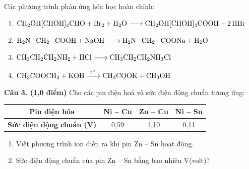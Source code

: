 \documentclass[11pt,a4paper]{article}
\begin{document}
\begin{tcolorbox}[colback=tableGreen!30,colframe=mainGreen!70,title=\textbf{Hướng dẫn giải chi tiết Câu 2},fonttitle=\bfseries]
Các phương trình phản ứng hóa học hoàn chỉnh:
\begin{enumerate}[label=\alph*),leftmargin=15pt,itemsep=3pt]
\item $\ce{CH2OH[CHOH]4CHO + Br2 + H2O -> CH2OH[CHOH]4COOH + 2HBr}$
\item $\ce{H2N-CH2-COOH + NaOH -> H2N-CH2-COONa + H2O}$
\item $\ce{CH3CH2CH2NH2 + HCl -> CH3CH2CH2NH3Cl}$
\item $\ce{CH3COOCH3 + KOH ->[t^\circ] CH3COOK + CH3OH}$
\end{enumerate}
\end{tcolorbox}

\vspace{2pt}
\noindent
\textbf{Câu 3. (1,0 điểm)} Cho các pin điện hoá và sức điện động chuẩn tương ứng:
\begin{center}
\renewcommand{\arraystretch}{1.2}
\begin{tabular}{|c|c|c|c|}
\hline
\rowcolor{tableGreen}
\textbf{Pin điện hóa} & \textbf{Ni -- Cu} & \textbf{Zn -- Cu} & \textbf{Ni -- Sn} \\
\hline
\textbf{Sức điện động chuẩn (V)} & 0,59 & 1,10 & 0,11 \\
\hline
\end{tabular}
\end{center}
\begin{enumerate}[label=\alph*),leftmargin=20pt,itemsep=1pt]
\item Viết phương trình ion diễn ra khi pin Zn -- Sn hoạt động.
\item Sức điện động chuẩn của pin Zn -- Sn bằng bao nhiêu V(volt)?
\end{enumerate}
\end{document}
